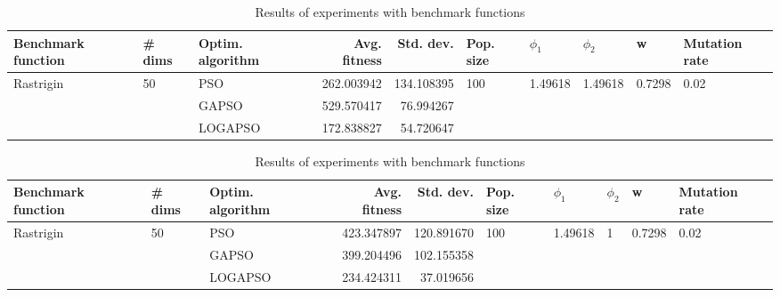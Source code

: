 \documentclass{article}
\begin{document}
\begin{table}
\centering
\caption{Results of experiments with benchmark functions}
\begin{tabular}{lllrrlllll}
\toprule
        Benchmark function &             \# dims & Optim. algorithm &  Avg. fitness &  Std. dev. &            Pop. size &               $\phi_{1}$ &               $\phi_{2}$ &                       w &         Mutation rate \\
\midrule
\multirow{3}{*}{Rastrigin} & \multirow{3}{*}{50} &              PSO &    262.003942 & 134.108395 & \multirow{3}{*}{100} & \multirow{3}{*}{1.49618} & \multirow{3}{*}{1.49618} & \multirow{3}{*}{0.7298} & \multirow{3}{*}{0.02} \\
                           &                     &            GAPSO &    529.570417 &  76.994267 &                      &                          &                          &                         &                       \\
                           &                     &          LOGAPSO &    172.838827 &  54.720647 &                      &                          &                          &                         &                       \\
\bottomrule
\end{tabular}
\end{table}
\begin{table}
\centering
\caption{Results of experiments with benchmark functions}
\begin{tabular}{lllrrlllll}
\toprule
        Benchmark function &             \# dims & Optim. algorithm &  Avg. fitness &  Std. dev. &            Pop. size &               $\phi_{1}$ &         $\phi_{2}$ &                       w &         Mutation rate \\
\midrule
\multirow{3}{*}{Rastrigin} & \multirow{3}{*}{50} &              PSO &    423.347897 & 120.891670 & \multirow{3}{*}{100} & \multirow{3}{*}{1.49618} & \multirow{3}{*}{1} & \multirow{3}{*}{0.7298} & \multirow{3}{*}{0.02} \\
                           &                     &            GAPSO &    399.204496 & 102.155358 &                      &                          &                    &                         &                       \\
                           &                     &          LOGAPSO &    234.424311 &  37.019656 &                      &                          &                    &                         &                       \\
\bottomrule
\end{tabular}
\end{table}
\end{document}
